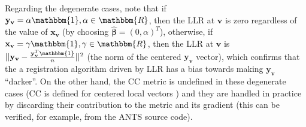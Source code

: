 Regarding the degenerate cases, note that if $\mathbf{y}_{\mathbf{v}} = \alpha \mathbbm{1}, \alpha\in \mathbbm{R}$, then the LLR at $\mathbf{v}$ is zero regardless of the value of $\mathbf{x}_{\mathbf{v}}$ (by choosing $\widehat{\boldsymbol{\beta}} = (0, \alpha)^{T}$), otherwise, if $\mathbf{x}_{\mathbf{v}} = \gamma \mathbbm{1}, \gamma\in \mathbbm{R}$, then the LLR at $\mathbf{v}$ is $||\mathbf{y}_{\mathbf{v}} - \frac{\mathbf{y}_{\mathbf{v}}^{T}\mathbbm{1}}{n}||^{2}$ (the norm of the centered $\mathbf{y}_{\mathbf{v}}$ vector), which confirms that the a registration algorithm driven by LLR has a bias towards making $\mathbf{y}_{\mathbf{v}}$ ``darker''. On the other hand, the CC metric is undefined in these degenerate cases (CC is defined for centered local vectors \cite{Avants2008}\cite{Avants2011}) and they are handled in practice by discarding their contribution to the metric and its gradient (this can be verified, for example, from the ANTS \cite{Avants2011a} source code).

